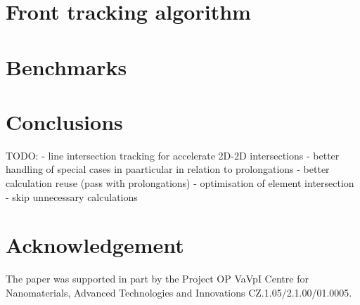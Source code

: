 \documentclass{elsarticle}
\begin{document}
% 


\section{Front tracking algorithm}
\section{Benchmarks}

\section{Conclusions}
TODO:
- line intersection tracking for accelerate 2D-2D intersections
- better handling of special cases in paarticular in relation to prolongations
- better calculation reuse (pass with prolongations)
- optimisation of element intersection - skip unnecessary calculations
\section{Acknowledgement}
The paper was supported in part by the Project OP
VaVpI Centre for Nanomaterials, Advanced Technologies  and Innovations
CZ.1.05/2.1.00/01.0005.
\end{document}
